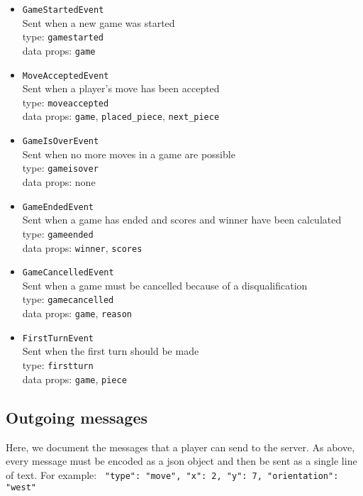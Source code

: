 \documentclass{scrartcl}
\begin{document}
\begin{itemize}
\item \texttt{GameStartedEvent} \\
  Sent when a new game was started \\
  type: \texttt{gamestarted} \\
  data props: \texttt{game}

\item \texttt{MoveAcceptedEvent} \\
  Sent when a player's move has been accepted \\
  type: \texttt{moveaccepted} \\
  data props: \texttt{game}, \texttt{placed\_piece}, \texttt{next\_piece}

\item \texttt{GameIsOverEvent} \\
  Sent when no more moves in a game are possible \\
  type: \texttt{gameisover} \\
  data props: none

\item \texttt{GameEndedEvent} \\
  Sent when a game has ended and scores and winner have been calculated \\
  type: \texttt{gameended} \\
  data props: \texttt{winner}, \texttt{scores}

\item \texttt{GameCancelledEvent} \\
  Sent when a game must be cancelled because of a disqualification \\
  type: \texttt{gamecancelled} \\
  data props: \texttt{game}, \texttt{reason}

\item \texttt{FirstTurnEvent} \\
  Sent when the first turn should be made \\
  type: \texttt{firstturn} \\
  data props: \texttt{game}, \texttt{piece}
\end{itemize}


\subsection{Outgoing messages}
Here, we document the messages that a player can send to the server.
As above, every message must be encoded as a json object and then be
sent as a single line of text. For example:
\texttt{{ "type": "move", "x": 2, "y": 7, "orientation": "west" }}
\end{document}
